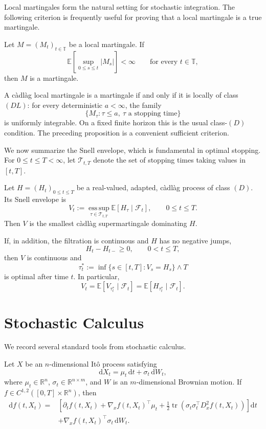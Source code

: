 Local martingales form the natural setting for stochastic integration. The following criterion is frequently useful for proving that a local martingale is a true martingale.

\begin{prop}
Let \(M=(M_t)_{t\in\mathbb T}\) be a local martingale. If
\[
\mathbb E\!\left[\sup_{0\le s\le t}|M_s|\right]<\infty
\qquad\text{for every }t\in\mathbb T,
\]
then \(M\) is a martingale.
\end{prop}

\begin{remark}
A c\`adl\`ag local martingale is a martingale if and only if it is locally of class \((DL)\): for every deterministic \(a<\infty\), the family
\[
\{M_\tau:\tau\le a,\ \tau\text{ a stopping time}\}
\]
is uniformly integrable. On a fixed finite horizon this is the usual class-\((D)\) condition. The preceding proposition is a convenient sufficient criterion.
\end{remark}

We now summarize the Snell envelope, which is fundamental in optimal stopping. For \(0\le t\le T<\infty\), let \(\mathcal T_{t,T}\) denote the set of stopping times taking values in \([t,T]\).

\begin{prop}
Let \(H=(H_t)_{0\le t\le T}\) be a real-valued, adapted, c\`adl\`ag process of class \((D)\). Its Snell envelope is
\[
V_t
:=\operatorname*{ess\,sup}_{\tau\in\mathcal T_{t,T}}
\mathbb E[H_\tau\mid\mathcal F_t],
\qquad 0\le t\le T.
\]
Then \(V\) is the smallest c\`adl\`ag supermartingale dominating \(H\).

If, in addition, the filtration is continuous and \(H\) has no negative jumps,
\[
H_t-H_{t-}\ge0,
\qquad 0<t\le T,
\]
then \(V\) is continuous and
\[
\tau_t^*
:=\inf\{s\in[t,T]:V_s=H_s\}\wedge T
\]
is optimal after time \(t\). In particular,
\[
V_t
=\mathbb E[V_{\tau_t^*}\mid\mathcal F_t]
=\mathbb E[H_{\tau_t^*}\mid\mathcal F_t].
\]
\end{prop}

\section{Stochastic Calculus}

We record several standard tools from stochastic calculus.

\begin{thm}[It\^o's formula]
Let \(X\) be an \(n\)-dimensional It\^o process satisfying
\[
\mathrm dX_t=\mu_t\,\mathrm dt+\sigma_t\,\mathrm dW_t,
\]
where \(\mu_t\in\mathbb R^n\), \(\sigma_t\in\mathbb R^{n\times m}\), and \(W\) is an \(m\)-dimensional Brownian motion. If \(f\in C^{1,2}([0,T]\times\mathbb R^n)\), then
\[
\begin{aligned}
\mathrm df(t,X_t)
={}&\left[
\partial_t f(t,X_t)
+\nabla_x f(t,X_t)^\top\mu_t
+\frac12\operatorname{tr}\!\left(
\sigma_t\sigma_t^\top D_x^2f(t,X_t)
\right)
\right]\mathrm dt\\
&+\nabla_x f(t,X_t)^\top\sigma_t\,\mathrm dW_t.
\end{aligned}
\]
\end{thm}

